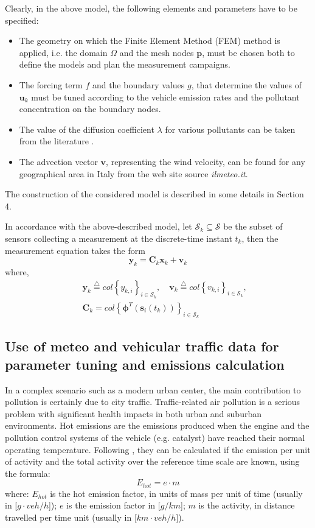 \documentclass[journal]{IEEEtran}
\newcommand{\defi} { \stackrel{\bigtriangleup}{=} }
\newcommand{\mb}{\mathbf}
\newcommand{\bs}{\boldsymbol}
\begin{document}
	Clearly, in the above model, the following elements and parameters have to be specified:
	\begin{itemize}
	\item The geometry on which the Finite Element Method (FEM) method is applied, i.e. the domain $\Omega$ and the mesh nodes $\textbf{p}$, must be chosen both to define the models 
	and plan the measurement 		campaigns.
	\item The forcing term $f$ and the boundary values $g$, that determine the values of $\textbf{u}_k$  must be tuned according to the vehicle emission rates 
	and the pollutant concentration on the boundary nodes.
	\item The value of the diffusion coefficient $\lambda$ for various pollutants can be taken from the literature \cite{Massman_001}.
	\item The advection vector $\mb{v}$, representing the wind velocity, can be found for any geographical area in Italy from the web site source \textit{ilmeteo.it}.
	\end{itemize}
	The construction of the considered model is described in some details in Section 4.
	
	In accordance with the above-described model, let $\mathcal S_k \subseteq \mathcal S $ be the subset of sensors collecting a measurement at the discrete-time instant
	$t_k$, then the measurement equation takes the form
	\begin{equation}\label{eq:y}
	\mb {y}_k = \mb{C}_k \mb{x}_k + \mb{v}_k
	\end{equation}
	where, 
	\begin{eqnarray*}
	&&\mb{y}_k \defi col \left\{ y_{k,i} \right\}_{i\in \mathcal{S}_k},  \quad \mb{v}_k \defi col \left\{ v_{k,i} \right\}_{i \in \mathcal{S}_k}, \\
	&& \mb{C}_k = col \left\{ \bs{\phi}^T(\mb{s}_i (t_k)) \right\}_{i \in \mathcal{S}_k}
	\end{eqnarray*}

\subsection{Use of meteo and vehicular traffic data for parameter tuning and emissions calculation}
In a complex scenario such as a modern urban center, the main contribution to pollution is certainly due to city traffic.
Traffic-related air pollution is a serious problem with significant health impacts in both urban and suburban environments. Hot emissions are the emissions produced when the engine and the pollution control systems
of the vehicle (e.g. catalyst) have reached their normal operating temperature. Following \cite{bib:MEET001}, they can be
calculated if the emission per unit of activity and the total activity over the reference time scale are known, using the formula:
\begin{equation} \label{hot_emission}
E_{hot} = e\cdot m
\end{equation}
where: $E_{hot}$ is the hot emission factor, in units of mass per unit of time (usually in [$g\cdot veh/h$]);
$e$ is the emission factor in [$g/km$];
 $m$ is the activity, in distance travelled per time unit (usually in [$km\cdot veh/h$]).
\end{document}
